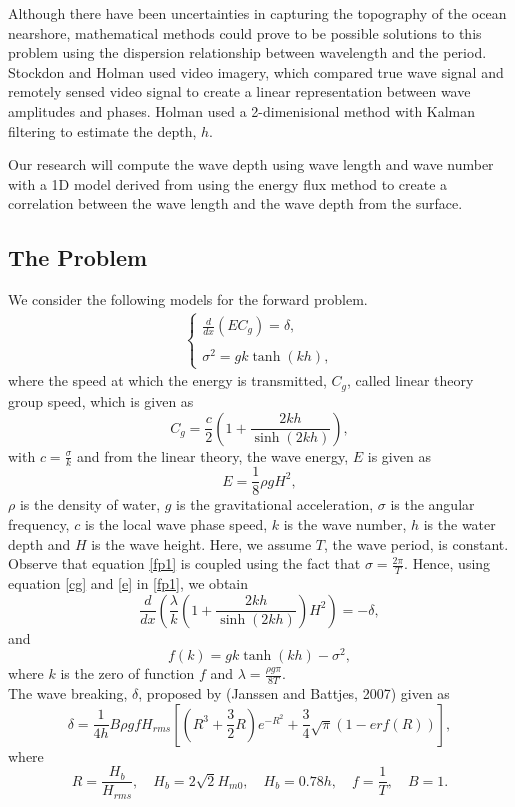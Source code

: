 Although there have been uncertainties in capturing the topography of the ocean nearshore, mathematical methods could prove to be possible solutions to this problem using the dispersion relationship between wavelength and the period. Stockdon and Holman used video imagery, which compared true wave signal and remotely sensed video signal to create a linear representation between wave amplitudes and phases. Holman used a 2-dimenisional method with Kalman filtering to estimate the depth, $h$.

Our research will compute the wave depth using wave length and wave number with a 1D model derived from using the energy flux method to create a correlation between the wave length and the wave depth from the surface.
\subsection{The Problem}
We consider the following models for the forward problem.
\begin{eqnarray}
\label{fp1}
\left \{
\begin{array}{lll}
\frac{d}{dx}\left(EC_g\right)=\delta,\\
\\
\sigma^2=gk\tanh(kh),
\label{ode}
\end{array}
\right.
\end{eqnarray}
where the speed at which the energy is transmitted, $C_g$, called linear theory group speed, which is given as
\begin{equation}
\label{cg}
C_g=\frac{c}{2}\left(1+\frac{2kh}{\sinh(2kh)}\right),
\end{equation}
with $c=\frac{\sigma}{k}$ and from the linear theory, the wave energy, $E$ is given as
\begin{equation}
\label{e}
E=\frac{1}{8}\rho g H^2,
\end{equation}
$\rho$ is the density of water, $g$ is the gravitational acceleration, $\sigma$ is the angular frequency, $c$ is the local wave phase speed, $k$ is the wave number, $h$ is the water depth and $H$ is the wave height. Here, we assume $T$, the wave period, is constant.\\ 


\noindent Observe that equation \ref{fp1} is coupled using the fact that $\sigma=\frac{2\pi}{T}$. Hence, using equation \ref{cg} and \ref{e} in \ref{fp1}, we obtain
\begin{equation}
\label{fpdelta}
\frac{d}{dx}\left( \frac{\lambda}{k}\left(1+\frac{2kh}{\sinh(2kh)}\right)H^2 \right)=-\delta,
\end{equation}  
and 
\begin{equation}
f(k) = gk\tanh(kh)-\sigma^2,
\end{equation}
where $k$ is the zero of function $f$ and $\lambda=\frac{\rho g \pi}{8T}$.\\
The wave breaking, $\delta$, proposed by (Janssen and Battjes, 2007) given as
\begin{equation}
\delta = \frac{1}{4h}B\rho g f H_{rms}\left[(R^3+\frac{3}{2}R)e^{-R^2}+\frac{3}{4}\sqrt{\pi}(1-erf(R))\right],
\end{equation}
where $$R=\frac{H_b}{H_{rms}}, \quad H_b = 2\sqrt{2}H_{m0},\quad H_b=0.78h,\quad f=\frac{1}{T},\quad B=1.$$
